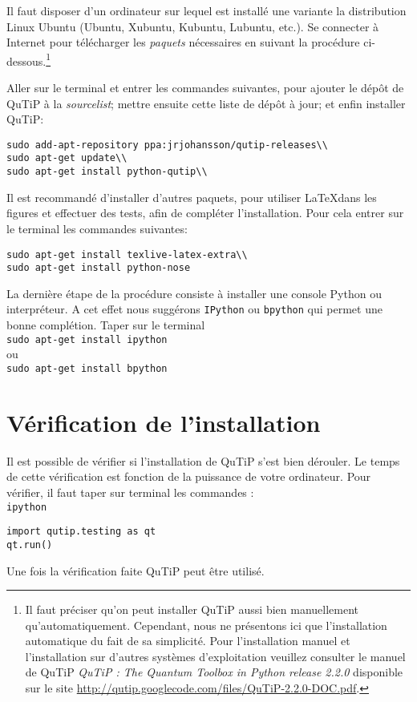 Il faut disposer d'un ordinateur sur lequel est installé une variante la 
distribution Linux Ubuntu (Ubuntu, Xubuntu, Kubuntu, Lubuntu, etc.). Se 
connecter à Internet pour télécharger les \emph{paquets} nécessaires 
en suivant la procédure ci-dessous.\footnote{Il faut préciser qu'on peut 
installer QuTiP aussi bien manuellement qu'automatiquement. Cependant, nous ne 
présentons ici que l'installation automatique du fait de sa simplicité. Pour 
l'installation manuel et l'installation sur d'autres systèmes d'exploitation 
veuillez consulter le manuel de QuTiP \emph{QuTiP : The Quantum Toolbox in 
Python release 2.2.0} disponible sur le site 
\url{http://qutip.googlecode.com/files/QuTiP-2.2.0-DOC.pdf}.}

Aller sur le terminal et entrer les commandes suivantes, pour ajouter le dépôt 
de QuTiP à la \emph{sourcelist}; mettre ensuite cette liste de dépôt à jour; 
et enfin installer QuTiP:\\
\begin{lstlisting}
sudo add-apt-repository ppa:jrjohansson/qutip-releases\\
sudo apt-get update\\
sudo apt-get install python-qutip\\
\end{lstlisting}

Il est recommandé d'installer d'autres paquets, pour utiliser \LaTeX dans les 
figures et effectuer des tests, afin de compléter l'installation. Pour cela 
entrer sur le terminal les commandes suivantes:\\
\begin{lstlisting}
sudo apt-get install texlive-latex-extra\\
sudo apt-get install python-nose
\end{lstlisting}

La dernière étape de la procédure consiste à installer une console Python ou 
interpréteur. A cet effet nous suggérons \texttt{IPython} ou \texttt{bpython} 
qui permet une bonne complétion. Taper sur le terminal\\
\texttt{sudo apt-get install ipython}\\
ou\\
\texttt{sudo apt-get install bpython}

\section{Vérification de l'installation}

Il est possible de vérifier si l'installation de QuTiP s'est bien dérouler. Le 
temps de cette vérification est fonction de la puissance de votre ordinateur. 
Pour vérifier, il faut taper sur terminal les commandes :\\
\texttt{ipython} \\
\begin{lstlisting}
import qutip.testing as qt
qt.run()
\end{lstlisting}
Une fois la vérification faite QuTiP peut être utilisé.


